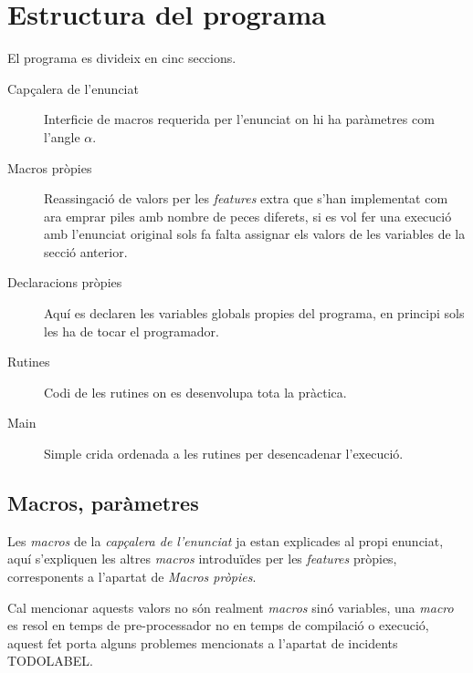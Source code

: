 \section{Estructura del programa}
El programa es divideix en cinc seccions.

\begin{description}
\item [Capçalera de l'enunciat] Interficie de macros requerida per l'enunciat
on hi ha paràmetres com l'angle $\alpha$.
\item [Macros pròpies] Reassingació de valors per les \emph{features} extra que
s'han implementat com ara emprar
piles amb nombre de peces diferets, si es vol fer una execució amb l'enunciat
original sols fa falta
assignar els valors de les variables de la secció anterior.
\item [Declaracions pròpies] Aquí es declaren les variables globals propies
del programa, en principi sols les 
ha de tocar el programador.
\item [Rutines] Codi de les rutines on es desenvolupa tota la pràctica.
\item [Main] Simple crida ordenada a les rutines per desencadenar l'execució.
\end{description}

\subsection{Macros, paràmetres}
Les \emph{macros} de la \emph{capçalera de l'enunciat} ja estan explicades al
propi enunciat, aquí s'expliquen les
altres \emph{macros} introduïdes per les \emph{features} pròpies, corresponents
a l'apartat de \emph{Macros pròpies}.

Cal mencionar aquests valors no són realment \emph{macros} sinó variables, una
\emph{macro} es resol en temps de pre-processador no en temps de compilació o execució,
aquest fet porta alguns problemes mencionats a l'apartat de incidents TODOLABEL.

